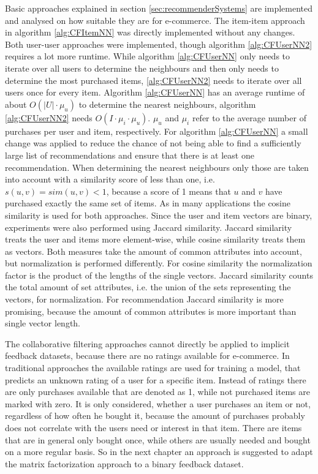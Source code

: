 \documentclass[10pt]{reportMaster}
\begin{document}
Basic approaches explained in section \ref{sec:recommenderSystems} are implemented and analysed on how suitable they are for e-commerce.
The item-item approach in algorithm \ref{alg:CFItemNN} was directly implemented without any changes.
Both user-user approaches were implemented, though algorithm \ref{alg:CFUserNN2} requires a lot more runtime.
While algorithm \ref{alg:CFUserNN} only needs to iterate over all users to determine the neighbours and then only needs to determine the most purchased items, \ref{alg:CFUserNN2} needs to iterate over all users once for every item.
Algorithm \ref{alg:CFUserNN} has an average runtime of about $O(|U| \cdot \mu_u)$ to determine the nearest neighbours, algorithm \ref{alg:CFUserNN2} needs $O(I \cdot \mu_i \cdot \mu_u)$.
$\mu_u$ and $\mu_i$ refer to the average number of purchases per user and item, respectively.
For algorithm \ref{alg:CFUserNN} a small change was applied to reduce the chance of not being able to find a sufficiently large list of recommendations and ensure that there is at least one recommendation.
When determining the nearest neighbours only those are taken into account with a similarity score of less than one, i.e. $s(u,v) = sim(u, v) < 1$, because a score of 1 means that $u$ and $v$ have purchased exactly the same set of items.
As in many applications the cosine similarity is used for both approaches.
Since the user and item vectors are binary, experiments were also performed using Jaccard similarity.
Jaccard similarity treats the user and items more element-wise, while cosine similarity treats them as vectors.
Both measures take the amount of common attributes into account, but normalization is performed differently.
For cosine similarity the normalization factor is the product of the lengths of the single vectors.
Jaccard similarity counts the total amount of set attributes, i.e. the union of the sets representing the vectors, for normalization.
For recommendation Jaccard similarity is more promising, because the amount of common attributes is more important than single vector length.

The collaborative filtering approaches cannot directly be applied to implicit feedback datasets, because there are no ratings available for e-commerce.
In traditional approaches the available ratings are used for training a model, that predicts an unknown rating of a user for a specific item.
Instead of ratings there are only purchases available that are denoted as 1, while not purchased items are marked with zero.
It is only considered, whether a user purchases an item or not, regardless of how often he bought it, because the amount of purchases probably does not correlate with the users need or interest in that item.
There are items that are in general only bought once, while others are usually needed and bought on a more regular basis. 
So in the next chapter an approach is suggested to adapt the matrix factorization approach to a binary feedback dataset.
\end{document}
